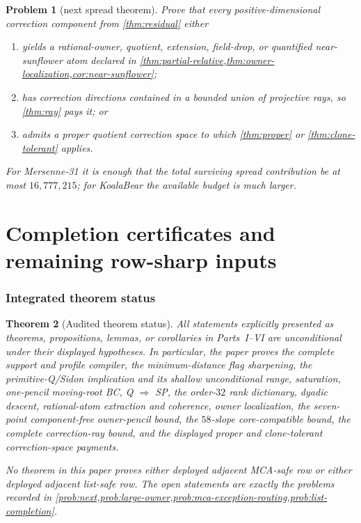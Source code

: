 \documentclass[11pt,a4paper]{amsart}
\numberwithin{equation}{section}
\newtheorem{theorem}{Theorem}[section]
\newtheorem{problem}[theorem]{Problem}
\theoremstyle{remark}
\begin{document}
\begin{problem}[next spread theorem]\label{prob:next}
Prove that every positive-dimensional correction component from \cref{thm:residual} either
\begin{enumerate}[label=\textup{(\alph*)}]
\item yields a rational-owner, quotient, extension, field-drop, or quantified near-sunflower atom declared in \cref{thm:partial-relative,thm:owner-localization,cor:near-sunflower};
\item has correction directions contained in a bounded union of projective rays, so \cref{thm:ray} pays it; or
\item admits a proper quotient correction space to which \cref{thm:proper} or \cref{thm:clone-tolerant} applies.
\end{enumerate}
For Mersenne-31 it is enough that the total surviving spread contribution be at most $16{,}777{,}215$; for KoalaBear the available budget is much larger.
\end{problem}


\part{Completion certificates and remaining row-sharp inputs}
\label{part:completion}

\section{Integrated theorem status}
\label{sec:status-and-obligations}
\begin{theorem}[Audited theorem status]\label{thm:audited-status}
All statements explicitly presented as theorems, propositions, lemmas, or corollaries in Parts~I--VI are unconditional under their displayed hypotheses.  In particular, the paper proves the complete support and profile compiler, the minimum-distance flag sharpening, the primitive-Q/Sidon implication and its shallow unconditional range, saturation, one-pencil moving-root BC, Q $\Rightarrow$ SP, the order-$32$ rank dictionary, dyadic descent, rational-atom extraction and coherence, owner localization, the seven-point component-free owner-pencil bound, the $58$-slope core-compatible bound, the complete correction-ray bound, and the displayed proper and clone-tolerant correction-space payments.

No theorem in this paper proves either deployed adjacent MCA-safe row or either deployed adjacent list-safe row.  The open statements are exactly the problems recorded in \cref{prob:next,prob:large-owner,prob:mca-exception-routing,prob:list-completion}.
\end{theorem}
\end{document}
